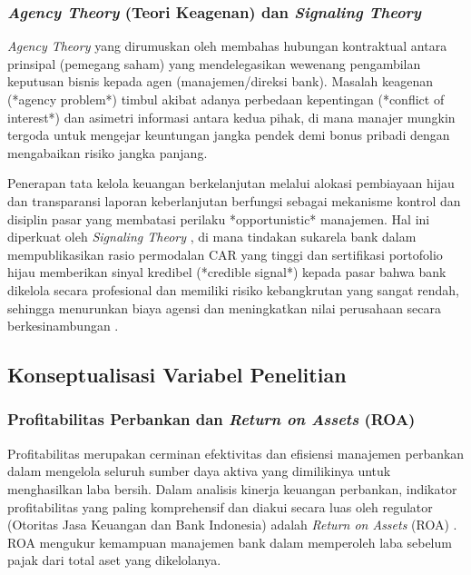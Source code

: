 \documentclass[12pt,a4paper]{article}
\numberwithin{equation}{section}
\begin{document}
\subsubsection{\emph{Agency Theory} (Teori Keagenan) dan \emph{Signaling Theory}}
\noindent
\emph{Agency Theory} yang dirumuskan oleh \citet{JensenMeckling1976} membahas hubungan kontraktual antara prinsipal (pemegang saham) yang mendelegasikan wewenang pengambilan keputusan bisnis kepada agen (manajemen/direksi bank). Masalah keagenan (*agency problem*) timbul akibat adanya perbedaan kepentingan (*conflict of interest*) dan asimetri informasi antara kedua pihak, di mana manajer mungkin tergoda untuk mengejar keuntungan jangka pendek demi bonus pribadi dengan mengabaikan risiko jangka panjang.

\noindent
Penerapan tata kelola keuangan berkelanjutan melalui alokasi pembiayaan hijau dan transparansi laporan keberlanjutan berfungsi sebagai mekanisme kontrol dan disiplin pasar yang membatasi perilaku *opportunistic* manajemen. Hal ini diperkuat oleh \emph{Signaling Theory} \citep{Spence1973}, di mana tindakan sukarela bank dalam mempublikasikan rasio permodalan CAR yang tinggi dan sertifikasi portofolio hijau memberikan sinyal kredibel (*credible signal*) kepada pasar bahwa bank dikelola secara profesional dan memiliki risiko kebangkrutan yang sangat rendah, sehingga menurunkan biaya agensi dan meningkatkan nilai perusahaan secara berkesinambungan \citep{JensenMeckling1976, SetiawanIndrawati2024}.

\subsection{Konseptualisasi Variabel Penelitian}

\subsubsection{Profitabilitas Perbankan dan \emph{Return on Assets} (ROA)}
\noindent
Profitabilitas merupakan cerminan efektivitas dan efisiensi manajemen perbankan dalam mengelola seluruh sumber daya aktiva yang dimilikinya untuk menghasilkan laba bersih. Dalam analisis kinerja keuangan perbankan, indikator profitabilitas yang paling komprehensif dan diakui secara luas oleh regulator (Otoritas Jasa Keuangan dan Bank Indonesia) adalah \emph{Return on Assets} (ROA) \citep{Dendawijaya2015, Riyadi2020}. ROA mengukur kemampuan manajemen bank dalam memperoleh laba sebelum pajak dari total aset yang dikelolanya.
\end{document}
